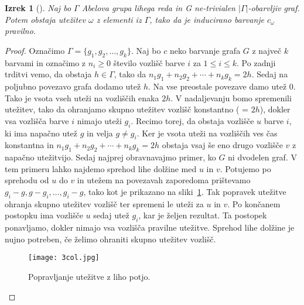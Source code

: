 \documentclass[12pt,a4paper,twoside]{article}
\theoremstyle{definition} %
\theoremstyle{plain} %
\newtheorem{izrek}[definicija]{Izrek}
\numberwithin{equation}{section}  %
\begin{document}
  \begin{izrek}[\citet{base}]
\label{res_3col}
  	Naj bo $\Gamma$ Abelova grupa lihega reda in G ne-trivialen $|\Gamma|$-obarvljiv graf. Potem obstaja utežitev $\omega$ z elementi iz $\Gamma$, tako da je inducirano barvanje $c_{\omega}$ pravilno.
  \end{izrek}

\begin{proof}
	Označimo $\Gamma = \{g_1, g_2, \ldots, g_k\}$. Naj bo $c$ neko barvanje grafa $G$ z največ $k$ barvami in označimo z $n_i \ge 0$ število vozlišč barve $i$ za $1 \le i \le k$. Po zadnji trditvi vemo, da obstaja $h \in \Gamma$, tako da $n_1g_1 + n_2g_2 + \cdots + n_kg_k = 2h$. Sedaj na poljubno povezavo grafa dodamo utež $h$. Na vse preostale povezave damo utež $0$. Tako je vsota vseh uteži na vozliščih enaka $2h$. V nadaljevanju bomo spremenili utežitev, tako da ohranjamo skupno utežitev vozlišč konstantno ( = $2h$), dokler vsa vozlišča barve $i$ nimajo uteži $g_i$. Recimo torej, da obstaja vozlišče $u$ barve $i$, ki ima napačno utež $g$ in velja $g \neq g_i$. Ker je vsota uteži na vozliščih ves čas konstantna in $n_1g_1 + n_2g_2 + \cdots + n_kg_k = 2h$ obstaja vsaj še eno drugo vozlišče $v$ z napačno utežitvijo. Sedaj najprej obravnavajmo primer, ko $G$ ni dvodelen graf. V tem primeru lahko najdemo sprehod lihe dolžine med $u$ in $v$. Potujemo po sprehodu od $u$ do $v$ in utežem na povezavah zaporedoma prištevamo $g_i - g, g - g_i, \ldots, g_i - g$, tako kot je prikazano na sliki~\ref{3col_1}. Tak popravek utežitve ohranja skupno utežitev vozlišč ter spremeni le uteži za $u$ in $v$. Po končanem postopku ima vozlišče $u$ sedaj utež $g_i$, kar je željen rezultat. Ta postopek ponavljamo, dokler nimajo vsa vozlišča pravilne utežitve. Sprehod lihe dolžine je nujno potreben, če želimo ohraniti skupno utežitev vozlišč.
 \begin{figure}[h!]
\caption{Popravljanje utežitve z liho potjo.}
\label{3col_1}
\centering
    \texttt{[image: 3col.jpg]}
    \end{figure}
	

\end{proof}
\end{document}
